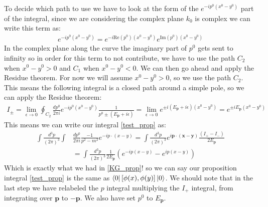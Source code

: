 \documentclass[11pt]{article}
\numberwithin{equation}{section}
\begin{document}
\begin{itemize}
   To decide which path to use we have to look at the form of the $e^{-ip^0(x^0-y^0)}$ part of the integral, since we are considering the complex plane $k_0$ is complex we can write this term as: 
   \begin{align*}
   e^{-ip^0(x^0-y^0)} = e^{-i\text{Re}(p^0)(x^0-y^0)}e^{\text{Im}(p^0)(x^0-y^0)}
   \end{align*}
   In the complex plane along the curve the imaginary part of $p^0$ gets sent to infinity so in order for this term to not contribute, we have to use the path $C_2$ when $x^0-y^0>0$ and $C_1$ when $x^0-y^0<0$.  We can then go ahead and apply the Residue theorem. For now we will assume $x^{0}-y^0>0$, so we use the path $C_{2}$. This means the following integral is a closed path around a simple pole, so we can apply the Residue theorem: 
   \begin{align*}
    I_{\pm} = \lim_{\epsilon \rightarrow 0 } \oint_{C_2}\frac{dp^0}{2\pi i}e^{-ip^{0}(x^{0}-y^{0})}\frac{1}{p^0\pm (E_{\textbf{p}}+i\epsilon)} = \lim_{\epsilon \rightarrow 0 }e^{\pm i(E_{\textbf{p}}+i\epsilon)(x^{0}-y^0)}=e^{\pm iE_{\textbf{p}}(x^{0}-y^0)}
    \end{align*} 
    This means we can write our integral \ref{test_prop} as:
    \begin{align*}
    \int \frac{d^3p}{(2\pi)^3}\int&\frac{dp^{0}}{2\pi i}\frac{-1}{p^2-m^2}e^{-ip\cdot(x-y)} = \int \frac{d^3p}{(2\pi)^3}e^{i\textbf{p}\cdot(\textbf{x}-\textbf{y})}\frac{(I_{+}-I_{-})}{2E_{\textbf{p}}}  \\
    & = \int \frac{d^3p}{(2\pi)^3}\frac{1}{2E_{\textbf{p}}}\left(e^{-ip(x-y)}-e^{ip(x-y)}\right)
    \end{align*}
    Which is exactly what we had in \ref{KG_prop}! so we can say our proposition integral \ref{test_prop} is the same as $\bra{0}[\phi(x),\phi(y)]\ket{0}$. We should note that in the last step we have relabeled the $p$ integral multiplying the $I_{+}$ integral, from integrating over $\textbf{p}$ to $ -\textbf{p}$. We also have set $p^{0}$ to $E_{\textbf{p}}$. 
\end{itemize}
\end{document}
